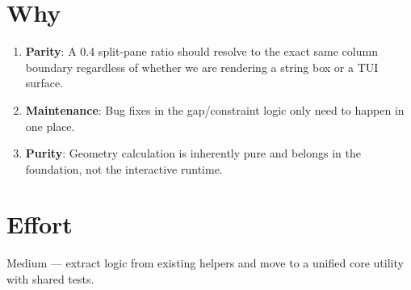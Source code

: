 \section{Why}\label{record-377-why}

\begin{enumerate}
\def\labelenumi{\arabic{enumi}.}
\tightlist
\item
  \textbf{Parity}: A 0.4 split-pane ratio should resolve to the exact same column boundary regardless of whether we are rendering a string box or a TUI surface.
\item
  \textbf{Maintenance}: Bug fixes in the gap/constraint logic only need to happen in one place.
\item
  \textbf{Purity}: Geometry calculation is inherently pure and belongs in the foundation, not the interactive runtime.
\end{enumerate}

\section{Effort}\label{record-377-effort}

Medium --- extract logic from existing helpers and move to a unified core utility with shared tests.

